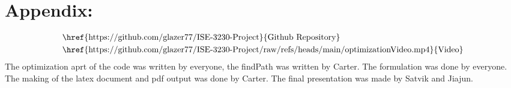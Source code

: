\documentclass[12pt]{extarticle}
\begin{document}
\newpage
\section*{\small Appendix:}
\begin{align*}
&\text{\href{https://github.com/glazer77/ISE-3230-Project}{Github Repository}} \\
&\text{\href{https://github.com/glazer77/ISE-3230-Project/raw/refs/heads/main/optimizationVideo.mp4}{Video}} \\
\end{align*}
The optimization aprt of the code was written by everyone, the findPath was written by Carter. The formulation was done by everyone. The making of the latex document and pdf output was done by Carter. The final presentation was made by Satvik and Jiajun.
\end{document}
